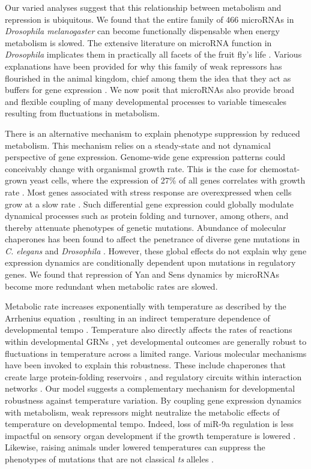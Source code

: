 Our varied analyses suggest that this relationship between metabolism and repression is ubiquitous. We found that the entire family of 466 microRNAs in \textit{Drosophila melanogaster} can become functionally dispensable when energy metabolism is slowed. The extensive literature on microRNA function in \textit{Drosophila} implicates them in practically all facets of the fruit fly's life \cite{Bushati2007,Carthew2017}. Various explanations have been provided for why this family of weak repressors has flourished in the animal kingdom, chief among them the idea that they act as buffers for gene expression \cite{Ebert2012}. We now posit that microRNAs also provide broad and flexible coupling of many developmental processes to variable timescales resulting from fluctuations in metabolism.

There is an alternative mechanism to explain phenotype suppression by reduced metabolism. This mechanism relies on a steady-state and not dynamical perspective of gene expression. Genome-wide gene expression patterns could conceivably change with organismal growth rate. This is the case for chemostat-grown yeast cells, where the expression of 27\% of all genes correlates with growth rate \cite{Brauer2008}. Most genes associated with stress response are overexpressed when cells grow at a slow rate \cite{Brauer2008,Lu2009}. Such differential gene expression could globally modulate dynamical processes such as protein folding and turnover, among others, and thereby attenuate phenotypes of genetic mutations. Abundance of molecular chaperones has been found to affect the penetrance of diverse gene mutations in \textit{C. elegans} and \textit{Drosophila} \cite{Casanueva2012,Rutherford1998}. However, these global effects do not explain why gene expression dynamics are conditionally dependent upon mutations in regulatory genes. We found that repression of Yan and Sens dynamics by microRNAs become more redundant when metabolic rates are slowed.

Metabolic rate increases exponentially with temperature as described by the Arrhenius equation \cite{Zuo2011}, resulting in an indirect temperature dependence of developmental tempo \cite{Gillooly2002}. Temperature also directly affects the rates of reactions within developmental GRNs \cite{Zuo2011}, yet developmental outcomes are generally robust to fluctuations in temperature across a limited range. Various molecular mechanisms have been invoked to explain this robustness. These include chaperones that create large protein-folding reservoirs \cite{Jarosz2010,Rutherford1998}, and regulatory circuits within interaction networks \cite{Li2009b}. Our model suggests a complementary mechanism for developmental robustness against temperature variation. By coupling gene expression dynamics with metabolism, weak repressors might neutralize the metabolic effects of temperature on developmental tempo. Indeed, loss of miR-9a regulation is less impactful on sensory organ development if the growth temperature is lowered \cite{Cassidy2013}. Likewise, raising animals under lowered temperatures can suppress the phenotypes of mutations that are not classical \textit{ts} alleles \cite{Child1935,Krafka1920,Lewis1980,Villee1943}.

